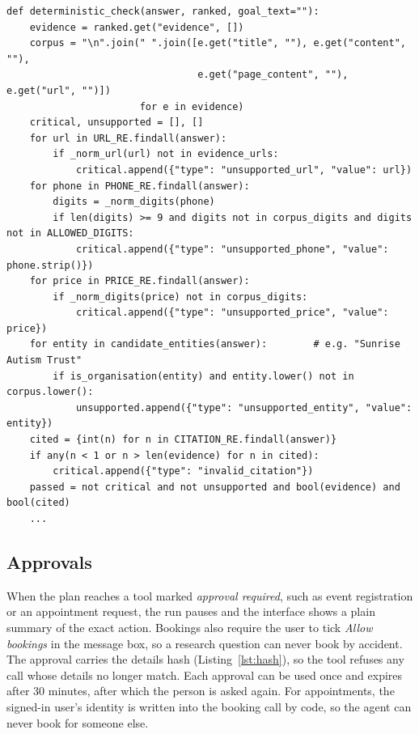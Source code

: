 \documentclass[11pt,a4paper]{article}
\newcommand{\code}[1]{\texttt{#1}}
\begin{document}
\par\noindent\begin{minipage}{\linewidth}\begin{lstlisting}[caption={Deterministic grounding check: specific facts must appear in the retrieved evidence (\code{agent/research/verification.py}, shortened).},label={lst:verify}]
def deterministic_check(answer, ranked, goal_text=""):
    evidence = ranked.get("evidence", [])
    corpus = "\n".join(" ".join([e.get("title", ""), e.get("content", ""),
                                 e.get("page_content", ""), e.get("url", "")])
                       for e in evidence)
    critical, unsupported = [], []
    for url in URL_RE.findall(answer):
        if _norm_url(url) not in evidence_urls:
            critical.append({"type": "unsupported_url", "value": url})
    for phone in PHONE_RE.findall(answer):
        digits = _norm_digits(phone)
        if len(digits) >= 9 and digits not in corpus_digits and digits not in ALLOWED_DIGITS:
            critical.append({"type": "unsupported_phone", "value": phone.strip()})
    for price in PRICE_RE.findall(answer):
        if _norm_digits(price) not in corpus_digits:
            critical.append({"type": "unsupported_price", "value": price})
    for entity in candidate_entities(answer):        # e.g. "Sunrise Autism Trust"
        if is_organisation(entity) and entity.lower() not in corpus.lower():
            unsupported.append({"type": "unsupported_entity", "value": entity})
    cited = {int(n) for n in CITATION_RE.findall(answer)}
    if any(n < 1 or n > len(evidence) for n in cited):
        critical.append({"type": "invalid_citation"})
    passed = not critical and not unsupported and bool(evidence) and bool(cited)
    ...
\end{lstlisting}\end{minipage}\par

\subsection{Approvals}
When the plan reaches a tool marked \emph{approval required}, such as event registration or an appointment
request, the run pauses and the interface shows a plain summary of the exact action. Bookings also
require the user to tick \emph{Allow bookings} in the message box, so a research question can never
book by accident. The approval carries the details hash (Listing~\ref{lst:hash}), so the tool refuses
any call whose details no longer match. Each approval can be used once and expires after 30 minutes, after
which the person is asked again. For appointments, the signed-in user's identity is written into the
booking call by code, so the agent can never book for someone else.
\end{document}
